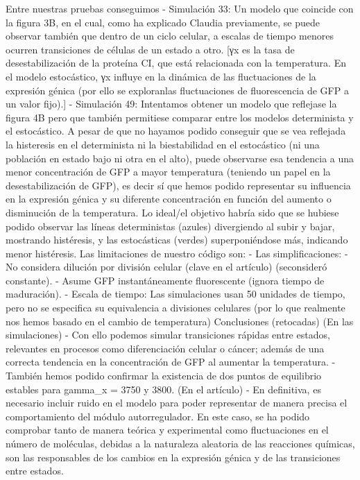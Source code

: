 Entre nuestras pruebas conseguimos
- Simulación 33: Un modelo que coincide con la figura 3B, en el cual, como ha explicado Claudia previamente, se puede observar también que dentro de un ciclo celular, a escalas de tiempo menores ocurren transiciones de células de un estado a otro.
    [γx es la tasa de desestabilización de la proteína CI, que está relacionada con la temperatura. En el modelo estocástico, γx influye en la dinámica de las fluctuaciones de la expresión génica (por ello se exploranlas fluctuaciones de  fluorescencia de GFP a un valor fijo).]
- Simulación 49: Intentamos obtener un modelo que reflejase la figura 4B pero que también permitiese comparar entre los modelos determinista y el estocástico. A pesar de que no hayamos podido conseguir que se vea reflejada la histeresis en el determinista ni la biestabilidad en el estocástico (ni una población en estado bajo ni otra en el alto), puede observarse esa tendencia a una menor concentración de GFP a mayor temperatura (teniendo un papel en la desestabilización de GFP), es decir sí que hemos podido representar su influencia en la expresión génica y su diferente concentración en función del aumento o disminución de la temperatura. 
Lo ideal/el objetivo habría sido que se hubiese podido observar las líneas deterministas (azules) divergiendo al subir y bajar, mostrando histéresis, y las estocásticas (verdes) superponiéndose más, indicando menor histéresis. 
Las limitaciones de nuestro código son:
- Las simplificaciones: 
    - No considera dilución por división celular (clave en el artículo) (seconsideró constante). 
    - Asume GFP instantáneamente fluorescente (ignora tiempo de maduración). 
- Escala de tiempo: Las simulaciones usan 50 unidades de tiempo, pero no se especifica su equivalencia a divisiones celulares (por lo que realmente nos hemos basado en el cambio de temperatura)
Conclusiones (retocadas)
    (En las simulaciones)
    - Con ello podemos simular transiciones rápidas entre estados, relevantes en procesos como diferenciación celular o cáncer; además de una correcta tendencia en la concentración de GFP al aumentar la temperatura.
    - También hemos podido confirmar la existencia de dos puntos de equilibrio estables para gamma_x = 3750 y 3800.
    (En el artículo)
    - En definitiva, es necesario incluir ruido en el modelo para poder representar de manera precisa el comportamiento del módulo autorregulador. En este caso, se ha podido comprobar tanto de manera teórica y experimental como fluctuaciones en el número de moléculas, debidas a la naturaleza aleatoria de las reacciones químicas, son las responsables de los cambios en la expresión génica y de las transiciones entre estados. 
